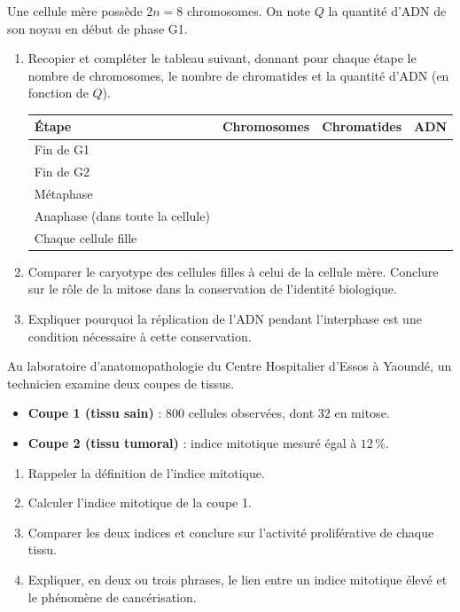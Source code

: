 \documentclass[11pt]{article}
\begin{document}
\begin{exercice}[Une cellule à $2n = 8$ chromosomes]
Une cellule mère possède $2n = 8$ chromosomes. On note $Q$ la quantité d'ADN de son noyau en début de phase G1.
\begin{enumerate}
\item Recopier et compléter le tableau suivant, donnant pour chaque étape le nombre de chromosomes, le nombre de chromatides et la quantité d'ADN (en fonction de $Q$).
\begin{center}
\begin{tabularx}{\linewidth}{|l|X|X|X|}
\hline
\rowcolor{popblueL} Étape & Chromosomes & Chromatides & ADN \\
\hline
Fin de G1 & & & \\
\hline
Fin de G2 & & & \\
\hline
Métaphase & & & \\
\hline
Anaphase (dans toute la cellule) & & & \\
\hline
Chaque cellule fille & & & \\
\hline
\end{tabularx}
\end{center}
\item Comparer le caryotype des cellules filles à celui de la cellule mère. Conclure sur le rôle de la mitose dans la conservation de l'identité biologique.
\item Expliquer pourquoi la réplication de l'ADN pendant l'interphase est une condition nécessaire à cette conservation.
\end{enumerate}
\end{exercice}

\begin{exercice}
Au laboratoire d'anatomopathologie du Centre Hospitalier d'Essos à Yaoundé, un technicien examine deux coupes de tissus.
\begin{itemize}
\item \textbf{Coupe 1 (tissu sain)} : $800$ cellules observées, dont $32$ en mitose.
\item \textbf{Coupe 2 (tissu tumoral)} : indice mitotique mesuré égal à $12\,\%$.
\end{itemize}
\begin{enumerate}
\item Rappeler la définition de l'indice mitotique.
\item Calculer l'indice mitotique de la coupe 1.
\item Comparer les deux indices et conclure sur l'activité proliférative de chaque tissu.
\item Expliquer, en deux ou trois phrases, le lien entre un indice mitotique élevé et le phénomène de cancérisation.
\end{enumerate}
\end{exercice}
\end{document}
